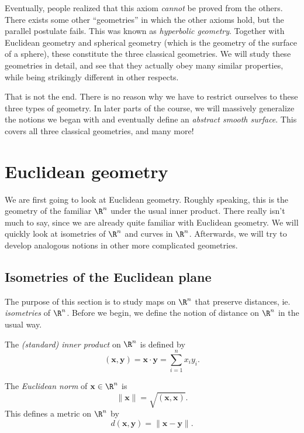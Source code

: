 \documentclass[a4paper]{article}
\begin{document}
Eventually, people realized that this axiom \emph{cannot} be proved from the others. There exists some other ``geometries'' in which the other axioms hold, but the parallel postulate fails. This was known as \emph{hyperbolic geometry}. Together with Euclidean geometry and spherical geometry (which is the geometry of the surface of a sphere), these constitute the three classical geometries. We will study these geometries in detail, and see that they actually obey many similar properties, while being strikingly different in other respects.

That is not the end. There is no reason why we have to restrict ourselves to these three types of geometry. In later parts of the course, we will massively generalize the notions we began with and eventually define an \emph{abstract smooth surface}. This covers all three classical geometries, and many more!

\section{Euclidean geometry}
We are first going to look at Euclidean geometry. Roughly speaking, this is the geometry of the familiar $\R^n$ under the usual inner product. There really isn't much to say, since we are already quite familiar with Euclidean geometry. We will quickly look at isometries of $\R^n$ and curves in $\R^n$. Afterwards, we will try to develop analogous notions in other more complicated geometries.

\subsection{Isometries of the Euclidean plane}
The purpose of this section is to study maps on $\R^n$ that preserve distances, ie. \emph{isometries} of $\R^n$. Before we begin, we define the notion of distance on $\R^n$ in the usual way.

\begin{defi}
  The \emph{(standard) inner product} on $\R^n$ is defined by
  \[
    (\mathbf{x}, \mathbf{y}) = \mathbf{x}\cdot \mathbf{y} = \sum_{i = 1}^n x_i y_i.
  \]
\end{defi}

\begin{defi}
  The \emph{Euclidean norm} of $\mathbf{x} \in \R^n$ is
  \[
    \|\mathbf{x}\| = \sqrt{(\mathbf{x}, \mathbf{x})}.
  \]
  This defines a metric on $\R^n$ by
  \[
    d(\mathbf{x}, \mathbf{y}) = \|\mathbf{x} - \mathbf{y}\|.
  \]
\end{defi}
\end{document}
